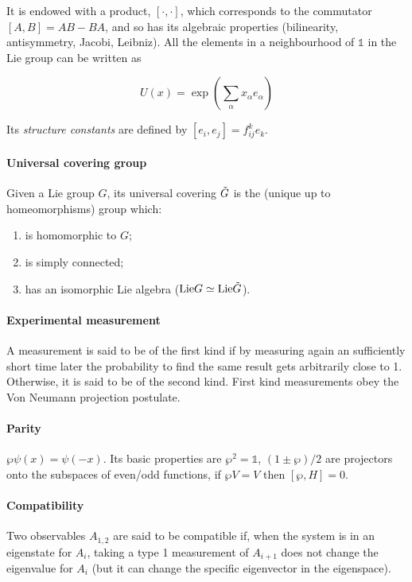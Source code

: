 \documentclass[main.tex]{subfiles}
\begin{document}
It is endowed with a product, $[\cdot, \cdot]$, which corresponds to the commutator $[A, B] = AB-BA$, and so has its algebraic properties (bilinearity, antisymmetry, Jacobi, Leibniz). All the elements in a neighbourhood of $\mathbb{1}$ in the Lie group can be written as

\begin{equation}
    U(x) = \exp(\sum_\alpha x_\alpha e_\alpha)
\end{equation}

Its \emph{structure constants} are defined by $[e_i, e_j] = f^k_{ij} e_k$.

\paragraph{Universal covering group} Given a Lie group $G$, its universal covering $\Tilde{G}$ is the (unique up to homeomorphisms) group which:

\begin{enumerate}
    \item is homomorphic to $G$;
    \item is simply connected;
    \item has an isomorphic Lie algebra ($\text{Lie}G \simeq \text{Lie}\Tilde{G}$).
\end{enumerate}

\paragraph{Experimental measurement} A measurement is said to be of the first kind if by measuring again an sufficiently short time later the probability to find the same result gets arbitrarily close to 1. Otherwise, it is said to be of the second kind.
First kind measurements obey the Von Neumann projection postulate.

\paragraph{Parity} $\wp \psi(x) = \psi(-x)$.
Its basic properties are $\wp^2 = \mathbb{1}$, $(1 \pm \wp)/2$ are projectors onto the subspaces of even/odd functions, if $\wp V = V$ then $[\wp,  H]=0$.

\paragraph{Compatibility}
Two observables $A_{1, 2}$ are said to be compatible if, when the system is in an eigenstate for $A_i$, taking a type 1 measurement of $A_{i+1}$ does not change the eigenvalue for $A_i$ (but it can change the specific eigenvector in the eigenspace).
\end{document}
